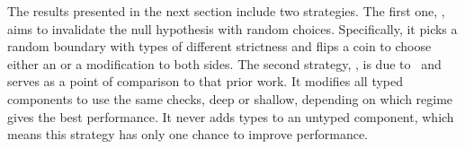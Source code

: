The results presented in the next section include two 
 \agnostickw{} strategies. The first one, \randkw{}, aims to invalidate the null
 hypothesis with random choices. Specifically, it picks a random boundary with
 types of different strictness and flips a coin to choose either an
 \optkw{} or a \conkw{} modification to both sides.
 The second \agnostickw{} strategy, \togglekw{}, is due to~\citet{g-deep-shallow}
 and serves as a point of comparison to that prior work.
 It modifies all typed components to use the same checks, deep or shallow,
 depending on which regime gives the best performance.
 It never adds types to an untyped component, which means this strategy has
 only one chance to improve performance.

